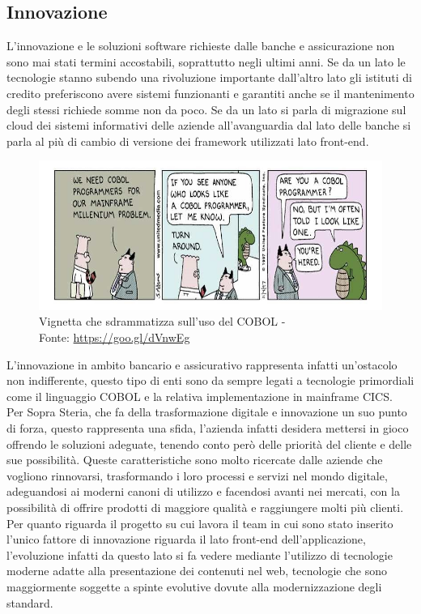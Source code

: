 	
	\subsection{Innovazione}
	
	L'innovazione e le soluzioni software richieste dalle banche e assicurazione non sono mai stati termini accostabili, soprattutto negli ultimi anni. Se da un lato le tecnologie stanno subendo una rivoluzione importante dall'altro lato gli istituti di credito preferiscono avere sistemi funzionanti e garantiti anche se il mantenimento degli stessi richiede somme non da poco. Se da un lato si parla di migrazione sul cloud dei sistemi informativi delle aziende all'avanguardia dal lato delle banche si parla al più di cambio di versione dei framework utilizzati lato front-end\glossario.\\

	\begin{figure}[H]
	\centering
	\includegraphics[width=1\textwidth]{immagini/VignettaCobol}
	\caption{Vignetta che sdrammatizza sull'uso del COBOL -\\ Fonte: \url{https://goo.gl/dVnwEg}}
	\end{figure}
	
	L'innovazione in ambito bancario e assicurativo rappresenta infatti un'ostacolo non indifferente, questo tipo di enti sono da sempre legati a tecnologie primordiali come il linguaggio COBOL e la relativa implementazione in mainframe CICS.\\
	
	Per Sopra Steria, che fa della trasformazione digitale e innovazione un suo punto di forza, questo rappresenta una sfida, l'azienda infatti desidera mettersi in gioco offrendo le soluzioni adeguate, tenendo conto però delle priorità del cliente e delle sue possibilità. Queste caratteristiche sono molto ricercate dalle aziende che vogliono rinnovarsi, trasformando i loro processi e servizi nel mondo digitale, adeguandosi ai moderni canoni di utilizzo e facendosi avanti nei mercati, con la possibilità di offrire prodotti di maggiore qualità e raggiungere molti più clienti.\\
	
	Per quanto riguarda il progetto su cui lavora il team in cui sono stato inserito l'unico fattore di innovazione riguarda il lato front-end dell'applicazione, l'evoluzione infatti da questo lato si fa vedere mediante l'utilizzo di tecnologie moderne adatte alla presentazione dei contenuti	nel web, tecnologie che sono maggiormente soggette a spinte evolutive dovute alla modernizzazione degli standard.